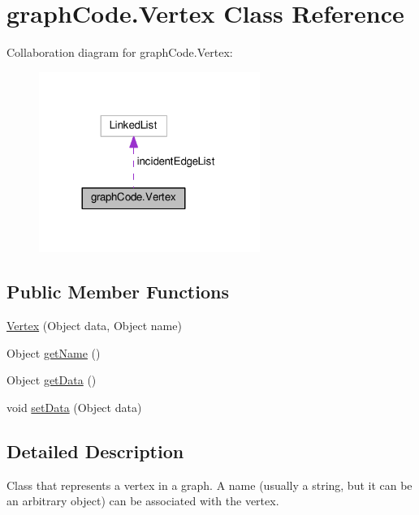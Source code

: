 \hypertarget{classgraphCode_1_1Vertex}{}\section{graph\+Code.\+Vertex Class Reference}
\label{classgraphCode_1_1Vertex}


Collaboration diagram for graph\+Code.\+Vertex\+:\nopagebreak
\begin{figure}[H]
\begin{center}
\leavevmode
\includegraphics[width=204pt]{classgraphCode_1_1Vertex__coll__graph}
\end{center}
\end{figure}
\subsection*{Public Member Functions}
\begin{DoxyCompactItemize}
\item 
\hyperlink{classgraphCode_1_1Vertex_a470d9de4897ec4d51766d95eedc6e98a}{Vertex} (Object data, Object name)
\item 
Object \hyperlink{classgraphCode_1_1Vertex_ab2e6c18e984280792043a0c7a15e8dca}{get\+Name} ()
\item 
Object \hyperlink{classgraphCode_1_1Vertex_a642a8be0bde891ee0118c54603b3de59}{get\+Data} ()
\item 
void \hyperlink{classgraphCode_1_1Vertex_ac53a68a138244f686f1b2d1d5cff0d7f}{set\+Data} (Object data)
\end{DoxyCompactItemize}


\subsection{Detailed Description}
Class that represents a vertex in a graph. A name (usually a string, but it can be an arbitrary object) can be associated with the vertex.

